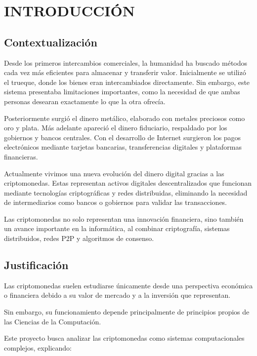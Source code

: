 \documentclass[12pt,a4paper]{article}
\begin{document}

\section{INTRODUCCIÓN}

\subsection{Contextualización}

Desde los primeros intercambios comerciales, la humanidad ha buscado métodos cada vez
más eficientes para almacenar y transferir valor. Inicialmente se utilizó el trueque, donde los
bienes eran intercambiados directamente. Sin embargo, este sistema presentaba
limitaciones importantes, como la necesidad de que ambas personas desearan
exactamente lo que la otra ofrecía.

Posteriormente surgió el dinero metálico, elaborado con metales preciosos como oro y
plata. Más adelante apareció el dinero fiduciario, respaldado por los gobiernos y bancos
centrales. Con el desarrollo de Internet surgieron los pagos electrónicos mediante tarjetas
bancarias, transferencias digitales y plataformas financieras.

Actualmente vivimos una nueva evolución del dinero digital gracias a las criptomonedas.
Estas representan activos digitales descentralizados que funcionan mediante tecnologías
criptográficas y redes distribuidas, eliminando la necesidad de intermediarios como bancos
o gobiernos para validar las transacciones.

Las criptomonedas no solo representan una innovación financiera, sino también un avance
importante en la informática, al combinar criptografía, sistemas distribuidos, redes P2P y
algoritmos de consenso.

\subsection{Justificación}

Las criptomonedas suelen estudiarse únicamente desde una perspectiva económica o
financiera debido a su valor de mercado y a la inversión que representan.

Sin embargo, su funcionamiento depende principalmente de principios propios de las
Ciencias de la Computación.

Este proyecto busca analizar las criptomonedas como sistemas computacionales complejos,
explicando:
\end{document}
